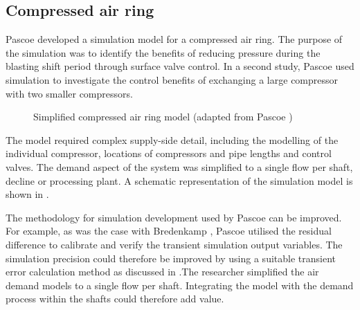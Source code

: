 \subsection{Compressed air ring}
Pascoe \cite{Pascoe2016Masters} developed a simulation model for a compressed air ring. The purpose of the simulation was to identify the benefits of reducing pressure during the blasting shift period through surface valve control. In a second study, Pascoe used simulation to investigate the control benefits of exchanging a large compressor with two smaller compressors.
\par 
\begin{figure}[!htbp]
	\centering
	\caption[Simplified compressed air ring model]{Simplified compressed air ring model (adapted from Pascoe \cite{Pascoe2016Masters})}
	\label{fig:Pascoe model}
\end{figure}
 The model required complex supply-side detail, including the modelling of the individual compressor, locations of compressors and pipe lengths and control valves. The demand aspect of the system was simplified to a single flow per shaft, decline or processing plant. A schematic representation of the simulation model is shown in .
 \par

The methodology for simulation development used by Pascoe can be improved. For example, as was the case with Bredenkamp \cite{Bredenkamp2013Masters}, Pascoe utilised the residual difference to calibrate and verify the transient simulation output variables. The simulation precision could therefore be improved by using a suitable transient error calculation method as discussed in .The researcher simplified the air demand models to a single flow per shaft. Integrating the model with the demand process within the shafts could therefore add value.

